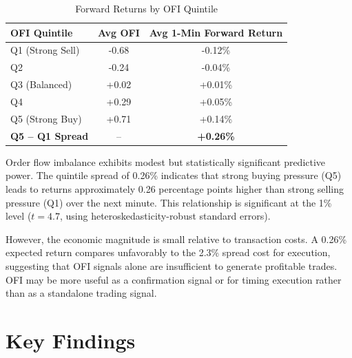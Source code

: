 \begin{table}[H]
\centering
\caption{Forward Returns by OFI Quintile}
\label{tab:ofi-quintiles}
\begin{tabular}{lcc}
\toprule
\textbf{OFI Quintile} & \textbf{Avg OFI} & \textbf{Avg 1-Min Forward Return} \\
\midrule
Q1 (Strong Sell) & -0.68 & -0.12\% \\
Q2 & -0.24 & -0.04\% \\
Q3 (Balanced) & +0.02 & +0.01\% \\
Q4 & +0.29 & +0.05\% \\
Q5 (Strong Buy) & +0.71 & +0.14\% \\
\midrule
\textbf{Q5 -- Q1 Spread} & -- & \textbf{+0.26\%} \\
\bottomrule
\end{tabular}
\end{table}

Order flow imbalance exhibits modest but statistically significant predictive power. The quintile spread of 0.26\% indicates that strong buying pressure (Q5) leads to returns approximately 0.26 percentage points higher than strong selling pressure (Q1) over the next minute. This relationship is significant at the 1\% level ($t = 4.7$, using heteroskedasticity-robust standard errors).

However, the economic magnitude is small relative to transaction costs. A 0.26\% expected return compares unfavorably to the 2.3\% spread cost for execution, suggesting that OFI signals alone are insufficient to generate profitable trades. OFI may be more useful as a confirmation signal or for timing execution rather than as a standalone trading signal.

\section{Key Findings}

